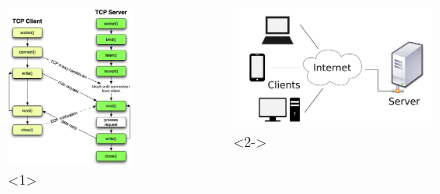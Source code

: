 \documentclass[10pt, xcolor=x11names]{beamer}
\begin{document}
\begin{frame}
\begin{columns}
\begin{figure}
				\includegraphics[width=1\linewidth]{img/tcplab}<1>
			\end{figure}
			\begin{figure}
			\centering
				\includegraphics[width=1\linewidth]{img/multiple-clients}<2->
			\end{figure}
	\end{columns}

\end{frame}
\end{document}
